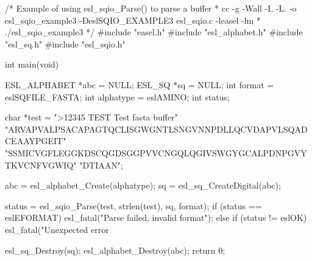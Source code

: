 \begin{cchunk}
/* Example of using esl_sqio_Parse() to parse a buffer
 *  cc -g -Wall -I. -L. -o esl_sqio_example3 -DeslSQIO_EXAMPLE3 esl_sqio.c -leasel -lm
 *  ./esl_sqio_example3
 */
#include "easel.h"
#include "esl_alphabet.h"
#include "esl_sq.h"
#include "esl_sqio.h"

int
main(void)
{
  ESL_ALPHABET *abc       = NULL;
  ESL_SQ       *sq        = NULL;
  int           format    = eslSQFILE_FASTA;
  int           alphatype = eslAMINO;
  int           status;

  char *test = ">12345 TEST Test fasta buffer\n"
               "ARVAPVALPSACAPAGTQCLISGWGNTLSNGVNNPDLLQCVDAPVLSQADCEAAYPGEIT\n"
               "SSMICVGFLEGGKDSCQGDSGGPVVCNGQLQGIVSWGYGCALPDNPGVYTKVCNFVGWIQ\n"
               "DTIAAN";

  abc = esl_alphabet_Create(alphatype);
  sq  = esl_sq_CreateDigital(abc);

  status = esl_sqio_Parse(test, strlen(test), sq, format);
  if      (status == eslEFORMAT) esl_fatal("Parse failed, invalid format");
  else if (status != eslOK)      esl_fatal("Unexpected error %

  esl_sq_Destroy(sq);
  esl_alphabet_Destroy(abc);
  return 0;
}
\end{cchunk}
